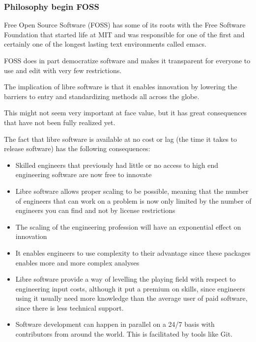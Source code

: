 \documentclass{beamer}
\begin{document}
\begin{frame}
\frametitle{Philosophy begin FOSS}

Free Open Source Software (FOSS) has some of its roots with the Free Software Foundation that started life at MIT and was responsible for one of the first and certainly one of the longest lasting text environments called emacs.

FOSS does in part democratize software and makes it transparent for everyone to use and edit with very few restrictions.

The implication of libre software is that it enables innovation by lowering the barriers to entry and standardizing methods all across the globe.

This might not seem very important at face value, but it has great consequences that have not been fully realized yet.

The fact that libre software is available at no cost or lag (the time it takes to release software) has the following consequences:

\begin{itemize}
\item Skilled engineers that previously had little or no access to high end engineering software are now free to innovate
\item Libre software allows proper scaling to be possible, meaning that the number of engineers that can work on a problem is now only limited by the number of engineers you can find and not by license restrictions
\item The scaling of the engineering profession will have an exponential effect on innovation
\item It enables engineers to use complexity to their advantage since these packages enables more and more complex analyses
\item Libre software provide a way of levelling the playing field with respect to engineering input costs, although it put a premium on skills, since engineers using it usually need more knowledge than the average user of paid software, since there is less technical support.
\item Software development can happen in parallel on a 24/7 basis with contributors from around the world.  This is facilitated by tools like Git.
\end{itemize}

\end{frame}

\end{document}
